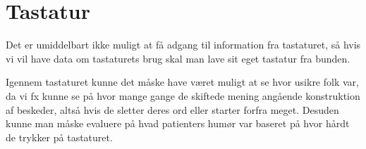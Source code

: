 \section{Tastatur}
Det er umiddelbart ikke muligt at få adgang til information fra tastaturet, så hvis vi vil have data om tastaturets brug skal man lave sit eget tastatur fra bunden.

Igennem tastaturet kunne det måske have været muligt at se hvor usikre folk var, da vi fx kunne se på hvor mange gange de skiftede mening angående konstruktion af beskeder, altså hvis de sletter deres ord eller starter forfra meget.
Desuden kunne man måske evaluere på hvad patienters humør var baseret på hvor hårdt de trykker på tastaturet.

\begin{comment}
Idéer til tastatur:
\begin{description}[style=nextline]
\item[Antal Rettelser]
\item[Ordbrug]
\item[Tid for en sætning]
\item[Tryk niveau]
\end{description}

Sensor
\begin{description}[style=nextline]
\item[Kan vi få fat i data?] Lyder som om det ikke er muligt at keylogge globalt. Man kan lave sit eget tastatur som erstatter default tastatur og keylogge derfra, men det lyder ikke til at det er muligt at lave en Service keylogger som får fat i alt som bliver skrevet på devicet.
\item[Er der begrænsninger?] Det lyder til at man bliver nødt til at lave sit eget tastatur.
\item[Hvilke data giver sensoren?] N/A
\end{description}

Da vi ikke tror det er praktisk kan denne nok blive udelukket som en mulighed og vi vil derfor ikke forsætte med analysen.

Analyse
\begin{description}[style=nextline]
\item[Har vi data nok?]
\item[Hvilke data skal benyttes?]
\item[Formål med analysen]
\item[Ide til visualisering (?)]
\item[(kort oprids af fremgangsmåde)]
\item[(gem illustrationer og kilder)]
\end{description}
\end{comment}




